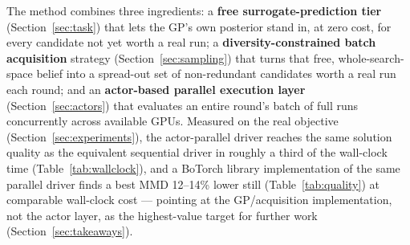 \documentclass[11pt]{article}
\begin{document}
The method combines three ingredients: a \textbf{free surrogate-prediction
tier} (Section~\ref{sec:task}) that lets the GP's own posterior stand in,
at zero cost, for every candidate not yet worth a real run; a
\textbf{diversity-constrained batch acquisition} strategy
(Section~\ref{sec:sampling}) that turns that free, whole-search-space
belief into a spread-out set of non-redundant candidates worth a real run
each round; and an \textbf{actor-based parallel execution layer}
(Section~\ref{sec:actors}) that evaluates an entire round's batch of full
runs concurrently across available GPUs. Measured on the real objective
(Section~\ref{sec:experiments}), the actor-parallel driver reaches the
same solution quality as the equivalent sequential driver in roughly a
third of the wall-clock time (Table~\ref{tab:wallclock}), and a BoTorch
library implementation of the same parallel driver finds a best MMD
12--14\% lower still (Table~\ref{tab:quality}) at comparable wall-clock
cost — pointing at the GP/acquisition implementation, not the actor
layer, as the highest-value target for further work
(Section~\ref{sec:takeaways}).
\end{document}
